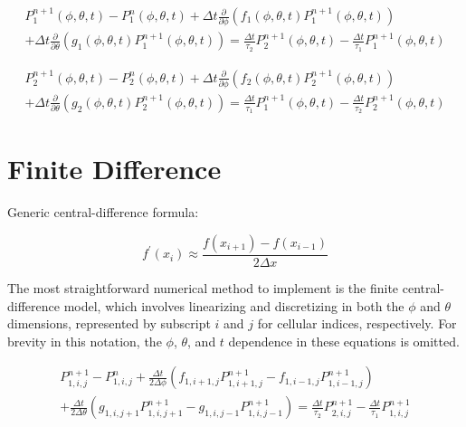 \documentclass[12pt,a4paper,pagesize=pdftex]{scrartcl}
\begin{document}
\begin{multline*}
    P_1^{n+1}\left(\phi, \theta, t\right) - P_1^n\left(\phi, \theta, t\right) + \Delta t \frac{\partial}{\partial \phi} \left(f_1 \left(\phi, \theta, t\right) P_1^{n+1} \left(\phi, \theta, t\right)\right) \\+ \Delta t\frac{\partial}{\partial \theta} \left(g_1 \left(\phi, \theta, t\right) P_1^{n+1} \left(\phi, \theta, t\right)\right) = \frac{\Delta t}{\tau_2} P_2^{n+1}\left(\phi, \theta, t\right) - \frac{\Delta t}{\tau_1} P_1^{n+1} \left(\phi, \theta, t\right)
\end{multline*}

\begin{multline*}
    P_2^{n+1}\left(\phi, \theta, t\right) - P_2^n\left(\phi, \theta, t\right) + \Delta t \frac{\partial}{\partial \phi} \left(f_2 \left(\phi, \theta, t\right) P_2^{n+1} \left(\phi, \theta, t\right)\right) \\+ \Delta t\frac{\partial}{\partial \theta} \left(g_2 \left(\phi, \theta, t\right) P_2^{n+1} \left(\phi, \theta, t\right)\right) = \frac{\Delta t}{\tau_1} P_1^{n+1}\left(\phi, \theta, t\right) - \frac{\Delta t}{\tau_2} P_2^{n+1} \left(\phi, \theta, t\right)
\end{multline*}

\newpage
\section*{Finite Difference}

Generic central-difference formula:

\begin{equation*}
    f^\prime \left(x_i\right) \approx \frac{f\left(x_{i+1}\right) - f\left(x_{i-1}\right)}{2 \Delta x}
\end{equation*}

The most straightforward numerical method to implement is the finite central-difference model, which involves linearizing and discretizing in both the \(\phi\) and \(\theta\) dimensions, represented by subscript \(i\) and \(j\) for cellular indices, respectively. For brevity in this notation, the \(\phi\), \(\theta\), and \(t\) dependence in these equations is omitted.

\begin{multline*}
    P_{1,i,j}^{n+1} - P_{1,i,j}^n + \frac{\Delta t}{2 \Delta \phi} \left(f_{1,i+1,j}P^{n+1}_{1,i+1,j} - f_{1,i-1,j}P^{n+1}_{1,i-1,j}\right) \\+ \frac{\Delta t}{2 \Delta \theta} \left(g_{1,i,j+1} P^{n+1}_{1,i,j+1} - g_{1,i,j-1} P^{n+1}_{1,i,j-1}\right) = \frac{\Delta t}{\tau_2} P^{n+1}_{2,i,j} - \frac{\Delta t}{\tau_1}P^{n+1}_{1,i,j}
\end{multline*}
\end{document}
